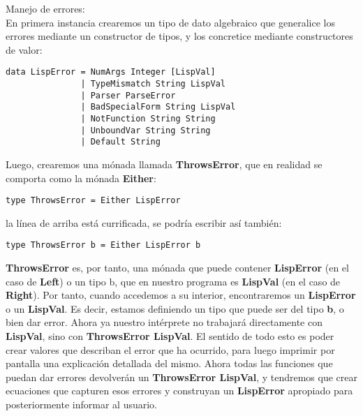 Manejo de errores:\\

En primera instancia crearemos un tipo de dato algebraico que generalice los errores mediante un constructor de tipos, y los concretice mediante constructores de valor:\\

\begin{minipage}{\linewidth}
\begin{small}
\begin{lstlisting}[frame=single]
data LispError = NumArgs Integer [LispVal]
               | TypeMismatch String LispVal
               | Parser ParseError
               | BadSpecialForm String LispVal
               | NotFunction String String
               | UnboundVar String String
               | Default String
\end{lstlisting}
\end{small}
\end{minipage}

Luego, crearemos una m\'onada llamada \textbf{ThrowsError}, que en realidad se comporta como la m\'onada \textbf{Either}:\\

\begin{minipage}{\linewidth}
\begin{small}
\begin{lstlisting}[frame=single]
type ThrowsError = Either LispError
\end{lstlisting}
\end{small}
\end{minipage}

la l\'inea de arriba est\'a currificada, se podr\'ia escribir as\'i tambi\'en:\\

\begin{minipage}{\linewidth}
\begin{small}
\begin{lstlisting}[frame=single]
type ThrowsError b = Either LispError b
\end{lstlisting}
\end{small}
\end{minipage}

\textbf{ThrowsError} es, por tanto, una m\'onada que puede contener \textbf{LispError} (en el caso de \textbf{Left}) o un tipo b, que en nuestro programa es \textbf{LispVal} (en el caso de \textbf{Right}). Por tanto, cuando accedemos a su interior, encontraremos un \textbf{LispError} o un \textbf{LispVal}. Es decir, estamos definiendo un tipo que puede ser del tipo \textbf{b}, o bien dar error. Ahora ya nuestro int\'erprete no trabajará directamente con \textbf{LispVal}, sino con \textbf{ThrowsError LispVal}. El sentido de todo esto es poder crear valores que describan el error que ha ocurrido, para luego imprimir por pantalla una explicaci\'on detallada del mismo. Ahora todas las funciones que puedan dar errores devolver\'an un \textbf{ThrowsError LispVal}, y tendremos que crear ecuaciones que capturen esos errores y construyan un \textbf{LispError} apropiado para posteriormente informar al usuario.\\

